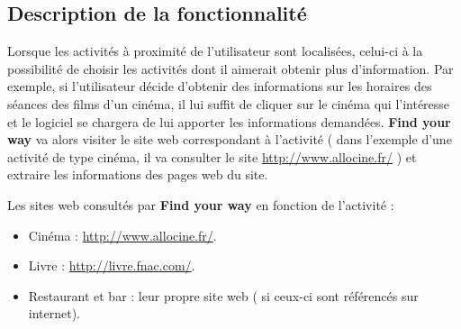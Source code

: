 \documentclass[10pt,a4paper]{report}
\begin{document}
\subsection{Description de la fonctionnalité}
\begin{flushleft}
Lorsque les activités à proximité de l'utilisateur sont localisées, celui-ci à la possibilité de choisir les activités dont il aimerait obtenir plus d'information.
Par exemple, si l'utilisateur décide d'obtenir des informations sur les horaires des séances des films d'un cinéma, il lui suffit de cliquer sur le cinéma qui l’intéresse et le logiciel se chargera de lui apporter les informations demandées.
\textbf{Find your way} va alors visiter le site web correspondant à l'activité ( dans l'exemple d'une activité de type cinéma, il va consulter le site \url{http://www.allocine.fr/} ) et extraire les informations des pages web du site.\linebreak

Les sites web consultés par \textbf{Find your way} en fonction de l'activité :

\begin{itemize}
\item Cinéma : \url{http://www.allocine.fr/}.

\item Livre : \url{http://livre.fnac.com/}.

\item Restaurant et bar : leur propre site web ( si ceux-ci sont référencés sur internet).

\end{itemize}
\end{flushleft}
\end{document}
